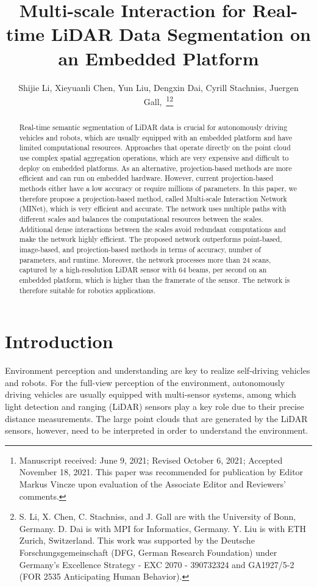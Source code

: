 \documentclass[letterpaper, 10 pt, journal, twoside]{ieeetran}
\title{\LARGE \bf
Multi-scale Interaction for Real-time LiDAR Data Segmentation on an Embedded Platform
}
\author{Shijie Li, Xieyuanli Chen, Yun Liu, Dengxin Dai, Cyrill Stachniss, Juergen Gall,~\IEEEmembership{Member,~IEEE}\thanks{Manuscript received: June 9, 2021; Revised October 6, 2021; Accepted November 18, 2021. This paper was recommended for publication by Editor Markus Vincze upon evaluation of the Associate Editor and Reviewers' comments.}\thanks{S. Li, X. Chen, C. Stachniss, and J. Gall are with the University of Bonn, Germany. D. Dai is with MPI for Informatics, Germany. Y. Liu is with ETH Zurich, Switzerland. This work was supported by the Deutsche Forschungsgemeinschaft (DFG, German Research Foundation) under Germany's Excellence Strategy - EXC 2070 - 390732324 and GA1927/5-2 (FOR 2535 Anticipating Human Behavior).}}
\newcommand{\todo}[1]{#1}
\begin{document}
\maketitle



\begin{abstract}
Real-time semantic segmentation of LiDAR data is crucial for autonomously driving vehicles and robots, which are usually equipped with an embedded platform and have limited computational resources. Approaches that operate directly on the point cloud use complex spatial aggregation operations, which are very expensive and difficult to deploy on embedded platforms. As an alternative, projection-based methods are more efficient and can run on embedded hardware. However, current projection-based methods either have a low accuracy or require millions of parameters. In this paper, we therefore propose a projection-based method, called Multi-scale Interaction Network (MINet), which is very efficient and accurate. The network uses multiple paths with different scales and balances the computational resources between the scales. Additional dense interactions between the scales avoid redundant computations and make the network highly efficient. The proposed network outperforms point-based, image-based, and projection-based methods in terms of accuracy, number of parameters, and runtime. \todo{Moreover, the network processes more than 24 scans, captured by a high-resolution LiDAR sensor with 64 beams, per second on an embedded platform, which is higher than the framerate of the sensor}. The network is therefore suitable for robotics applications.



\end{abstract}


\section{Introduction}\label{sec:introduction}

Environment perception and understanding are key to realize self-driving vehicles and robots.
For the full-view perception of the environment, autonomously driving vehicles are usually equipped with multi-sensor systems, among which light detection and ranging (LiDAR) sensors play a key role due to their precise distance measurements. The large point clouds that are generated by the LiDAR sensors, however, need to be interpreted in order to understand the environment.
\end{document}
